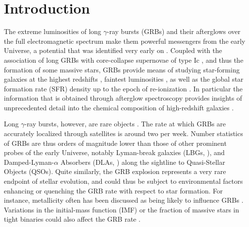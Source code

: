 \documentclass[traditabstract, longauth]{aa}
\begin{document}
\maketitle

\section{Introduction}

The extreme luminosities of long $\gamma$-ray bursts (GRBs) and their afterglows \citep[e.g.,][for recent reviews]{2009ARA&A..47..567G, 2014arXiv1410.0679K} over the full electromagnetic spectrum make them powerful messengers from the early Universe, a potential that was identified very early on \citep[e.g.,][]{1998MNRAS.294L..13W, 2000ApJ...536....1L}. Coupled with the association of long GRBs with core-collapse supernovae of type Ic \citep[e.g.,][]{1998Natur.395..670G, 2003Natur.423..847H, 2006Natur.442.1011P}, and thus the formation of some massive stars, GRBs provide means of studying star-forming galaxies at the highest redshifts \citep[e.g.,][]{2007ApJ...671..272C, 2009ApJ...691..152C, 2012ApJ...754...46T}, faintest luminosities \citep[e.g.,][]{2001ApJ...546..672V, 2012ApJ...749L..38T}, as well as the global star formation rate (SFR) density up to the epoch of re-ionization \citep[e.g.,][]{2009ApJ...705L.104K, 2012ApJ...744...95R, 2012A&A...539A.113E}. In particular the information that is obtained through afterglow spectroscopy provides insights of unprecedented detail into the chemical composition of high-redshift galaxies \citep[e.g.,][]{2006A&A...451L..47F, 2009ApJ...691L..27P, 2013MNRAS.428.3590T, 2015ApJ...804...51C}.

Long $\gamma$-ray bursts, however, are rare objects \citep[e.g.,][]{2004ApJ...607L..17P, 2007ApJ...657L..73G}. The rate at which GRBs are accurately localized through satellites is around two per week. Number statistics of GRBs are thus orders of magnitude lower than those of other prominent probes of the early Universe, notably Lyman-break galaxies (LBGs, \citealp[e.g.,][]{1996ApJ...462L..17S}), and Damped-Lyman-$\alpha$ Absorbers (DLAs, \citealp[e.g.,][]{2005ARA&A..43..861W}) along the sightline to Quasi-Stellar Objects (QSOs). Quite similarly, the GRB explosion represents a very rare endpoint of stellar evolution, and could thus be subject to environmental factors enhancing or quenching the GRB rate with respect to star formation. For instance, metallicity often has been discussed as being likely to influence GRBs \citep[e.g.,][]{2006AcA....56..333S, 2008AJ....135.1136M}. Variations in the initial-mass function (IMF) or the fraction of massive stars in tight binaries could also affect the GRB rate \citep[][]{2014ApJ...789...23K}.
\end{document}
